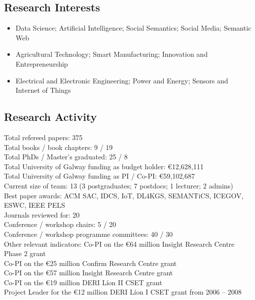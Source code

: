 \documentclass[10pt,a4paper]{res} %
\begin{document}
\begin{resume}
\subsection*{Research Interests}

\begin{itemize} \itemsep -2pt
\item Data Science; Artificial Intelligence; Social Semantics; Social Media; Semantic Web
\item Agricultural Technology; Smart Manufacturing; Innovation and Entrepreneurship
\item Electrical and Electronic Engineering; Power and Energy; Sensors and Internet of Things
\end{itemize}

\subsection*{Research Activity}

\begin{center}
Total refereed papers: \hfill 375 \\
Total books / book chapters: \hfill 9 / 19 \\
Total PhDs / Master's graduated: \hfill 25 / 8 \\
Total University of Galway funding as budget holder: \hfill \euro{}12,628,111 \\
Total University of Galway funding as PI / Co-PI: \hfill \euro{}59,102,687 \\
Current size of team: \hfill 13 (3 postgraduates; 7 postdocs; 1 lecturer; 2 admins) \\
Best paper awards: \hfill ACM SAC, IDCS, IoT, DL4KGS, SEMANTiCS, ICEGOV, ESWC, IEEE PELS \\
Journals reviewed for: \hfill 20 \\
Conference / workshop chairs: \hfill 5 / 20 \\
Conference / workshop programme committees: \hfill 40 / 30 \\
Other relevant indicators: \hfill Co-PI on the \euro{}64 million Insight Research Centre Phase 2 grant \\ \hfill Co-PI on the \euro{}25 million Confirm Research Centre grant \\ \hfill Co-PI on the \euro{}57 million Insight Research Centre grant \\ \hfill Co-PI on the \euro{}19 million DERI L\'{i}on II CSET grant \\ \hfill Project Leader for the \euro{}12 million DERI L\'{i}on I CSET grant from 2006 -- 2008
\end{center}


\end{resume}
\end{document}
